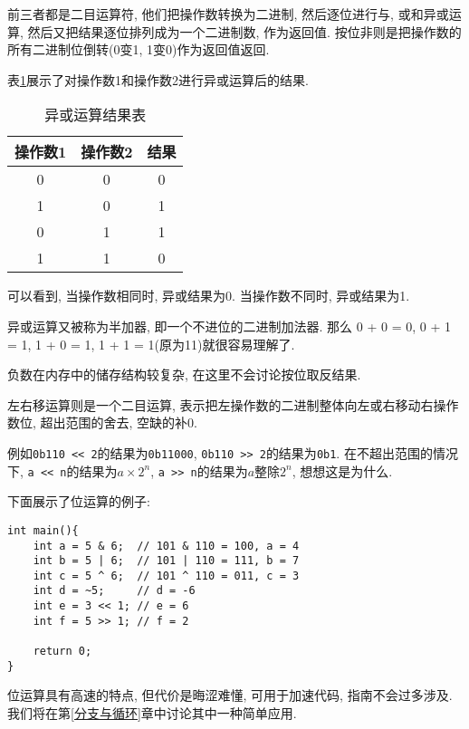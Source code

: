         前三者都是二目运算符, 他们把操作数转换为二进制, 然后逐位进行与, 或和异或运算, 然后又把结果逐位排列成为一个二进制数, 作为返回值. 按位非则是把操作数的所有二进制位倒转(0变1, 1变0)作为返回值返回.

        表\ref{异或运算结果表}展示了对操作数1和操作数2进行异或运算后的结果.

        \begin{table}[htbp]
            \centering
            \renewcommand\arraystretch{1.5}
            \begin{tabular}{c c|c}
                操作数1 & 操作数2 & 结果 \\
                \hline
                0       & 0      & 0    \\
                1       & 0      & 1    \\
                0       & 1      & 1    \\
                1       & 1      & 0    \\
            \end{tabular}
            \caption{异或运算结果表} \label{异或运算结果表}
        \end{table}

        可以看到, 当操作数相同时, 异或结果为0. 当操作数不同时, 异或结果为1.

        异或运算又被称为半加器, 即一个不进位的二进制加法器. 那么 0 + 0 = 0, 0 + 1 = 1, 1 + 0 = 1, 1 + 1 = 1(原为11)就很容易理解了.

        负数在内存中的储存结构较复杂, 在这里不会讨论按位取反结果.

        左右移运算则是一个二目运算, 表示把左操作数的二进制整体向左或右移动右操作数位, 超出范围的舍去, 空缺的补0.

        例如\texttt{0b110 << 2}的结果为\texttt{0b11000}, \texttt{0b110 >> 2}的结果为\texttt{0b1}. 在不超出范围的情况下, \texttt{a << n}的结果为$a\times 2^n$, \texttt{a >> n}的结果为$a$整除$2^n$, 想想这是为什么.

        下面展示了位运算的例子:
\begin{lstlisting}
int main(){
    int a = 5 & 6;  // 101 & 110 = 100, a = 4
    int b = 5 | 6;  // 101 | 110 = 111, b = 7
    int c = 5 ^ 6;  // 101 ^ 110 = 011, c = 3
    int d = ~5;     // d = -6
    int e = 3 << 1; // e = 6
    int f = 5 >> 1; // f = 2

    return 0;
}
\end{lstlisting}

        位运算具有高速的特点, 但代价是晦涩难懂, 可用于加速代码, 指南不会过多涉及. 我们将在第\ref{分支与循环}章中讨论其中一种简单应用.

